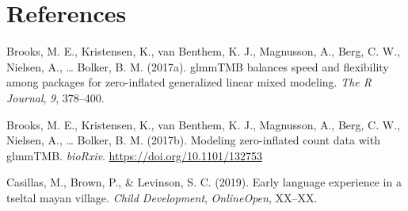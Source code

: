 \documentclass[,man,floatsintext]{apa6}
\begin{document}
\FloatBarrier

\section{References}\label{refs}

\begingroup
\setlength{\parindent}{-0.5in} \setlength{\leftskip}{0.5in}

\hypertarget{refs}{}
\hypertarget{ref-R-glmmTMB}{}
Brooks, M. E., Kristensen, K., van Benthem, K. J., Magnusson, A., Berg,
C. W., Nielsen, A., \ldots{} Bolker, B. M. (2017a). glmmTMB balances
speed and flexibility among packages for zero-inflated generalized
linear mixed modeling. \emph{The R Journal}, \emph{9}, 378--400.

\hypertarget{ref-brooks2017modeling}{}
Brooks, M. E., Kristensen, K., van Benthem, K. J., Magnusson, A., Berg,
C. W., Nielsen, A., \ldots{} Bolker, B. M. (2017b). Modeling
zero-inflated count data with glmmTMB. \emph{bioRxiv}.
\url{https://doi.org/10.1101/132753}

\hypertarget{ref-casillas2019early}{}
Casillas, M., Brown, P., \& Levinson, S. C. (2019). Early language
experience in a tseltal mayan village. \emph{Child Development},
\emph{OnlineOpen}, XX--XX.

\endgroup
\end{document}
